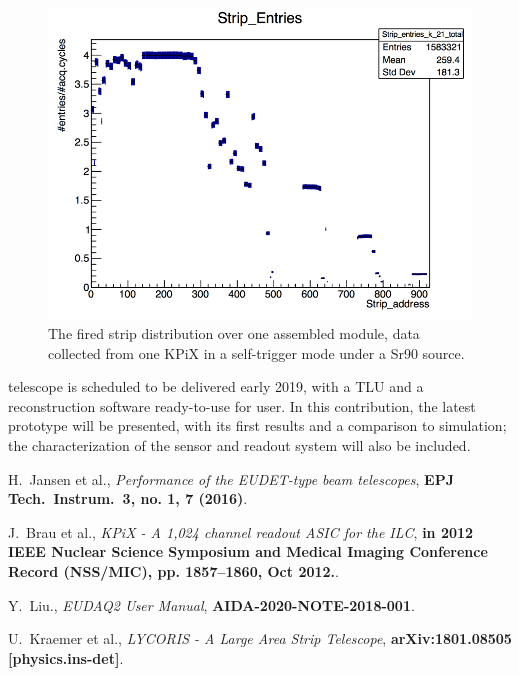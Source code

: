 \begin{figure}[!ht]%
\centering
\includegraphics[width=0.49\linewidth]{pics/S58_K2_2018_05_07_16_49_42_strip_entries.png}
\caption{The fired strip distribution over one assembled module, data collected from one KPiX in a self-trigger mode under a Sr90 source. }%
\label{fig:2figs}%
\end{figure}

\lycoris telescope is scheduled to be delivered early 2019, with a TLU and a reconstruction software ready-to-use for user.
In this contribution, the latest \lycoris prototype will be presented, with its first results and a comparison to simulation;
the characterization of the sensor and readout system will also be included.

\footnotesize
\begin{thebibliography}{1}

 H.~Jansen et al., {\em Performance of the EUDET-type beam telescopes},
\textbf{EPJ Tech.\ Instrum.\  {\bf 3}, no. 1, 7 (2016)}.

 J.~Brau et al., {\em KPiX - A 1,024 channel readout ASIC for the ILC},
\textbf{in 2012 IEEE Nuclear Science Symposium and Medical Imaging Conference Record (NSS/MIC), pp. 1857–1860, Oct 2012.}.

 Y.~Liu., {\em EUDAQ2 User Manual},
\textbf{AIDA-2020-NOTE-2018-001}.

 U.~Kraemer et al., {\em LYCORIS - A Large Area Strip Telescope},
\textbf{arXiv:1801.08505 [physics.ins-det]}.


\end{thebibliography}


